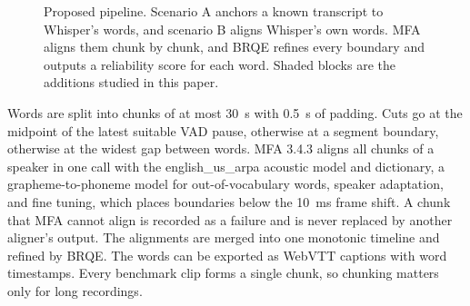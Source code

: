\documentclass[conference,a4paper]{IEEEtran}
\begin{document}
\begin{figure}[t]
\centering
\caption{Proposed pipeline. Scenario A anchors a known transcript to Whisper's words, and scenario B aligns Whisper's own words. MFA aligns them chunk by chunk, and BRQE refines every boundary and outputs a reliability score for each word. Shaded blocks are the additions studied in this paper.}
\label{fig:pipeline}
\end{figure}

Words are split into chunks of at most 30~s with 0.5~s of padding. Cuts go at the midpoint of the latest suitable VAD pause, otherwise at a segment boundary, otherwise at the widest gap between words. MFA 3.4.3 aligns all chunks of a speaker in one call with the english\_us\_arpa acoustic model and dictionary, a grapheme-to-phoneme model for out-of-vocabulary words, speaker adaptation, and fine tuning, which places boundaries below the 10~ms frame shift. A chunk that MFA cannot align is recorded as a failure and is never replaced by another aligner's output. The alignments are merged into one monotonic timeline and refined by BRQE. The words can be exported as WebVTT captions with word timestamps. Every benchmark clip forms a single chunk, so chunking matters only for long recordings.
\end{document}
